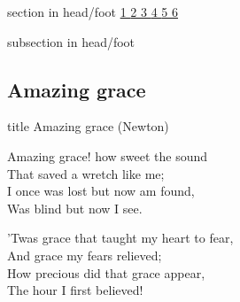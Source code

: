 \documentclass[aspectratio=169]{beamer}
\begin{document}
{
{ 
 {
 \begin{beamercolorbox}[ht=4.5ex,dp=1.5ex,%
      leftskip=.3cm,rightskip=.3cm plus1fil]{section in head/foot}
 \fontsize{12}{25}\selectfont 
\hyperlink{Amazing grace[](Newton)1}{1  }\hyperlink{Amazing grace[](Newton)2}{2  }\hyperlink{Amazing grace[](Newton)3}{3  }\hyperlink{Amazing grace[](Newton)4}{4  }\hyperlink{Amazing grace[](Newton)5}{5  }\hyperlink{Amazing grace[](Newton)6}{6  } 
 \end{beamercolorbox}%
  \begin{beamercolorbox}[ht=2.5ex,dp=1.125ex,%
   leftskip=.3cm,rightskip=.3cm plus1fil]{subsection in head/foot}
   \insertauthor
 \end{beamercolorbox}%
 }
}
\subsection{Amazing grace}
\hypertarget{Amazing grace[](Newton)}{}
\begin{frame}{}
 \vfill
  \centering
  \begin{beamercolorbox}[sep=8pt,center,shadow=true,rounded=true]{title}
    Amazing grace (Newton)    
  \end{beamercolorbox}
  \vfill
\end{frame}

\hypertarget{Amazing grace[](Newton)1}{}
\begin{frame}{}
\fontsize{21.428571428571427}{25.71428571428571}\selectfont

Amazing grace! how sweet the sound\\ 
That saved a wretch like me;\\ 
I once was lost but now am found,\\ 
Was blind but now I see.

\end{frame}
\hypertarget{Amazing grace[](Newton)2}{}
\begin{frame}{}
\fontsize{21.428571428571427}{25.71428571428571}\selectfont

'Twas grace that taught my heart to fear,\\ 
And grace my fears relieved;\\ 
How precious did that grace appear,\\ 
The hour I first believed!

\end{frame}
\hypertarget{Amazing grace[](Newton)3}{}
\begin{frame}{}
\fontsize{21.428571428571427}{25.71428571428571}\selectfont


\end{frame}}
\end{document}

